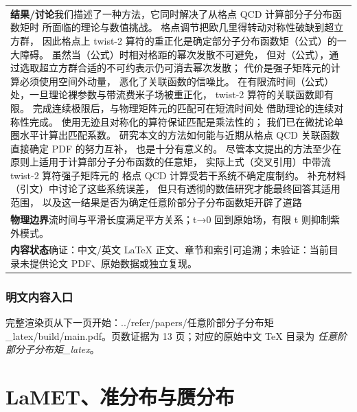 \documentclass[UTF8,11pt,oneside]{ctexbook}
\begin{document}
\begin{table}[htbp]
\begin{tabular}{@{}p{}@{}}
    \textbf{结果/讨论}\quad 我们描述了一种方法，它同时解决了从格点 QCD 计算部分子分布函数矩时 所面临的理论与数值挑战。 格点调节把欧几里得转动对称性破缺到超立方群， 因此格点上 twist-2 算符的重正化是确定部分子分布函数矩（公式）的一大障碍。 虽然当（公式）时相对格距的幂次发散不可避免， 但对（公式），通过选取超立方群合适的不可约表示仍可消去幂次发散； 代价是强子矩阵元的计算必须使用空间外动量， 恶化了关联函数的信噪比。 在有限流时间（公式）处，一旦理论裸参数与带流费米子场被重正化， twist-2 算符的关联函数即有限。 完成连续极限后，与物理矩阵元的匹配可在短流时间处 借助理论的连续对称性完成。 使用无迹且对称化的算符保证匹配是乘法性的； 我们已在微扰论单圈水平计算出匹配系数。 研究本文的方法如何能与近期从格点 QCD 关联函数直接确定 PDF 的努力互补， 也是十分有意义的。 尽管本文提出的方法至少在原则上适用于计算部分子分布函数的任意矩， 实际上式（交叉引用）中带流 twist-2 算符强子矩阵元的 格点 QCD 计算受若干系统不确定度制约。 补充材料（引文）中讨论了这些系统误差， 但只有透彻的数值研究才能最终回答其适用范围， 以及这一结果是否为确定任意阶部分子分布函数矩开辟了道路 \\
    \textbf{物理边界}\quad 流时间与平滑长度满足平方关系；t→0 回到原始场，有限 t 则抑制紫外模式。 \\
    \textbf{内容状态}\quad 确证：中文/英文 LaTeX 正文、章节和索引可追溯；未验证：当前目录未提供论文 PDF、原始数据或独立复现。 \\
    \bottomrule
  \end{tabular}
\end{table}
\section*{明文内容入口}
\noindent 完整渲染页从下一页开始：../\allowbreak{}refer/\allowbreak{}papers/\allowbreak{}任意阶部分子分布矩\_\allowbreak{}latex/\allowbreak{}build/\allowbreak{}main.pdf。页数证据为 13 页；对应的原始中文 TeX 目录为 \emph{任意阶部分子分布矩\_latex}。
\clearpage

\clearpage

\part{LaMET、准分布与赝分布}
\end{document}
